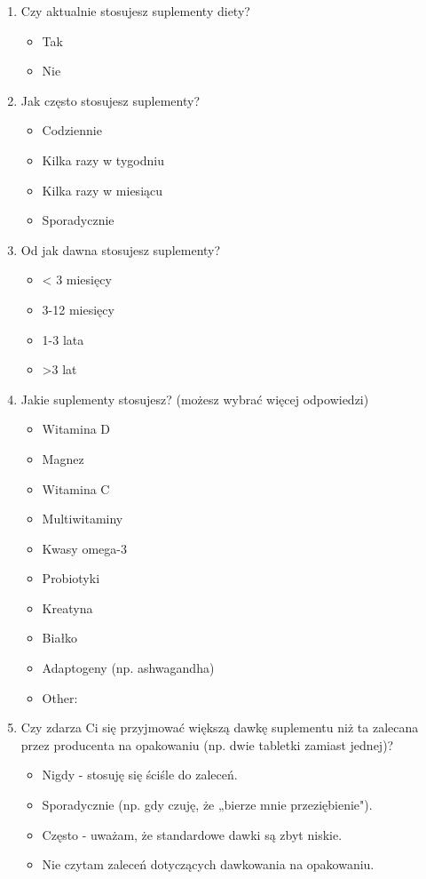 \documentclass[a4paper, 12pt, oneside]{article}
\begin{document}
\begin{enumerate}
    \item Czy aktualnie stosujesz suplementy diety?
    \begin{itemize}
        \item Tak
        \item Nie
    \end{itemize}

    \item Jak często stosujesz suplementy?
    \begin{itemize}
        \item Codziennie
        \item Kilka razy w tygodniu
        \item Kilka razy w miesiącu
        \item Sporadycznie
    \end{itemize}

    \item Od jak dawna stosujesz suplementy?
    \begin{itemize}
        \item < 3 miesięcy
        \item 3-12 miesięcy
        \item 1-3 lata
        \item >3 lat
    \end{itemize}

    \item Jakie suplementy stosujesz? (możesz wybrać więcej odpowiedzi)
    \begin{itemize}
        \item Witamina D
        \item Magnez
        \item Witamina C
        \item Multiwitaminy
        \item Kwasy omega-3
        \item Probiotyki
        \item Kreatyna
        \item Białko
        \item Adaptogeny (np. ashwagandha)
        \item Other:
    \end{itemize}

    \item Czy zdarza Ci się przyjmować większą dawkę suplementu niż ta zalecana przez producenta na opakowaniu (np. dwie tabletki zamiast jednej)?
    \begin{itemize}
        \item Nigdy - stosuję się ściśle do zaleceń.
        \item Sporadycznie (np. gdy czuję, że „bierze mnie przeziębienie").
        \item Często - uważam, że standardowe dawki są zbyt niskie.
        \item Nie czytam zaleceń dotyczących dawkowania na opakowaniu.
    \end{itemize}


\end{enumerate}
\end{document}
